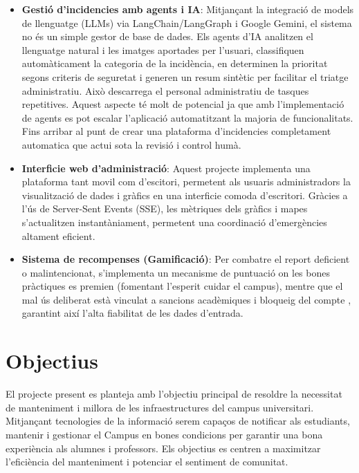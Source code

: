 \documentclass[10pt,a4paper,twocolumn,twoside]{article}
\begin{document}
		\begin{itemize}
			\item \textbf{Gestió d'incidencies amb agents i IA}: Mitjançant la integració de models de llenguatge (LLMs) via LangChain/LangGraph i Google Gemini, el sistema no és un simple gestor de base de dades. Els agents d'IA analitzen el llenguatge natural i les imatges aportades per l'usuari, classifiquen automàticament la categoria de la incidència, en determinen la prioritat segons criteris de seguretat i generen un resum sintètic per facilitar el triatge administratiu. Això descarrega el personal administratiu de tasques repetitives. Aquest aspecte té molt de potencial ja que amb l'implementació de agents es pot escalar l'aplicació automatitzant la majoria de funcionalitats. Fins arribar al punt de crear una plataforma d'incidencies completament automatica que actui sota la revisió i control humà.
			
			\item \textbf{Interficie web d'administració}: Aquest projecte implementa una plataforma tant movil com d'escitori, permetent als usuaris administradors la visualització de dades i gràfics en una interficie comoda d'escritori. Gràcies a l'ús de Server-Sent Events (SSE), les mètriques dels gràfics i mapes s'actualitzen instantàniament, permetent una coordinació d'emergències altament eficient.
			
			\item \textbf{Sistema de recompenses (Gamificació)}: Per combatre el report deficient o malintencionat, s'implementa un mecanisme de puntuació on les bones pràctiques es premien (fomentant l'esperit cuidar el campus), mentre que el mal ús deliberat està vinculat a sancions acadèmiques i bloqueig del compte , garantint així l'alta fiabilitat de les dades d'entrada.
			
		\end{itemize}
		
		\section{Objectius}
		El projecte present es planteja amb l’objectiu principal de resoldre la necessitat de manteniment i millora de les infraestructures del campus universitari. Mitjançant tecnologies de la informació serem capaços de notificar als estudiants, mantenir i gestionar el Campus en bones condicions per garantir una bona experiència als alumnes i professors. Els objectius es centren a maximitzar l'eficiència del manteniment i potenciar el sentiment de comunitat.
		
\end{document}
